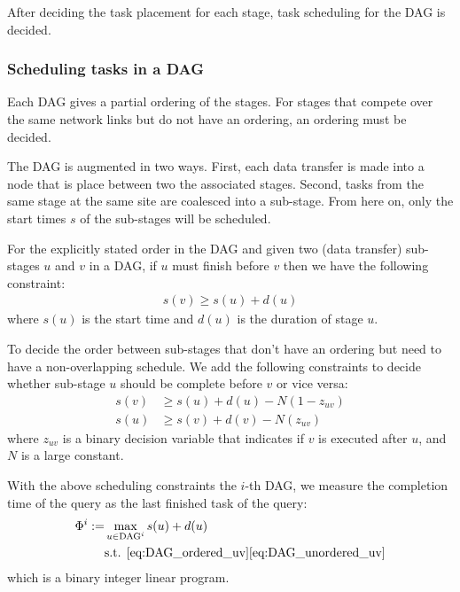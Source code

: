 After deciding the task placement for each stage, task scheduling for the DAG is decided.

\subsubsection{Scheduling tasks in a DAG}

Each DAG gives a partial ordering of the stages.
For stages that compete over the same network links but do not have an ordering, an ordering must be decided.

The DAG is augmented in two ways.
First, each data transfer is made into a node that is place between two the associated stages.
Second, tasks from the same stage at the same site are coalesced into a sub-stage.
From here on, only the start times $s$ of the sub-stages will be scheduled.

For the explicitly stated order in the DAG and given two (data transfer) sub-stages $u$ and $v$ in a DAG, if $u$ must finish before $v$ then we have the following constraint:
\begin{align}\label{eq:DAG_ordered_uv}
	s(v) \geq s(u) + d(u)
\end{align}
where $s(u)$ is the start time and $d(u)$ is the duration of stage $u$.

To decide the order between sub-stages that don't have an ordering but need to have a non-overlapping schedule.
We add the following constraints to decide whether sub-stage $u$ should be complete before $v$ or vice versa:
\begin{subequations} \label{eq:DAG_unordered_uv}
	\begin{align}
		s(v) & \geq s(u) + d(u) - N(1-z_{uv}) \\
		s(u) & \geq s(v) + d(v) - N(z_{uv})
	\end{align}
\end{subequations}
where $z_{uv}$ is a binary decision variable that indicates if $v$ is executed after $u$, and $N$ is a large constant.

With the above scheduling constraints the $i$-th DAG, we measure the completion time of the query as the last finished task of the query:
\begin{subequations}\label{eq:DAG_opt_schedule}
	\begin{align}
		\Phi^i := & \max_{u\in\text{DAG}^i} s(u) + d(u)\\
		& \text{s.t. } \eqref{eq:DAG_ordered_uv} \eqref{eq:DAG_unordered_uv}
	\end{align}
\end{subequations}
which is a binary integer linear program.

